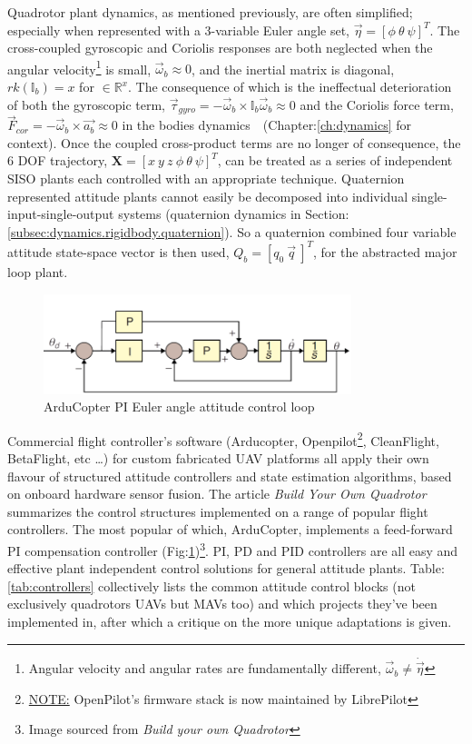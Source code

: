 \par
Quadrotor plant dynamics, as mentioned previously, are often simplified; especially when represented with a 3-variable Euler angle set, $\vec{\eta} = [\phi ~\theta ~\psi]^T$. The cross-coupled gyroscopic and Coriolis responses are both neglected when the angular velocity\footnote{Angular velocity and angular rates are fundamentally different, $\vec{\omega}_b\not=\dot{\vec{\eta}}$} is small, $\vec{\omega}_b \approx 0$, and the inertial matrix is diagonal, $rk(\mathbb{I}_b)= x$ for $\in\mathbb{R}^x$. The consequence of which is the ineffectual deterioration of both the gyroscopic term, $\vec{\tau}_{gyro}=-\vec{\omega}_b \times \mathbb{I}_b\vec{\omega}_b \approx 0$ and the  Coriolis force term, $\vec{F}_{cor}=-\vec{\omega}_b \times \vec{a_b} \approx 0$ in the bodies dynamics~~(Chapter:\ref{ch:dynamics} for context). Once the coupled cross-product terms are no longer of consequence, the 6 DOF trajectory, $\mathbf{X}=[x ~y ~z ~\phi ~\theta ~\psi]^T$, can be treated as a series of independent SISO plants each controlled with an appropriate technique. Quaternion represented attitude plants cannot easily be decomposed into individual single-input-single-output systems (quaternion dynamics in Section:\ref{subsec:dynamics.rigidbody.quaternion}). So a quaternion combined four variable attitude state-space vector is then used, $Q_b = [q_0 ~\vec{q}\>]^T$, for the abstracted major loop plant.
\par
\begin{figure}[hbtp]
\centering
\includegraphics[width=0.8\textwidth]{figs/arducopter-pi}
\caption{ArduCopter PI Euler angle attitude control loop}
\label{fig:arducopter-pi}
\end{figure}
Commercial flight controller's software (Arducopter\cite{arducoptersite}, Openpilot\cite{openpilotsite}\footnote{\underline{NOTE:} OpenPilot's firmware stack is now maintained by LibrePilot}, CleanFlight\cite{cleanflight}, BetaFlight\cite{betaflight}, etc \ldots) for custom fabricated UAV platforms all apply their own flavour of structured attitude controllers and state estimation algorithms, based on onboard hardware sensor fusion. The article \emph{Build Your Own Quadrotor}\cite{buildyourownquad} summarizes the control structures implemented on a range of popular flight controllers. The most popular of which, ArduCopter, implements a feed-forward PI compensation controller (Fig:\ref{fig:arducopter-pi})\footnote{Image sourced from \emph{Build your own Quadrotor}\cite{buildyourownquad}}.  PI, PD and PID controllers are all easy and effective plant independent control solutions for general attitude plants. Table:\ref{tab:controllers} collectively lists the common attitude control blocks (not exclusively quadrotors UAVs but MAVs too) and which projects they've been implemented in, after which a critique on the more unique adaptations is given.
